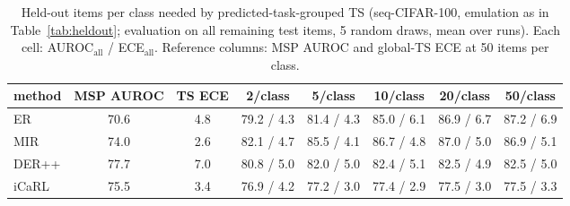 \begin{table}[h]\centering\small
\caption{Held-out items per class needed by predicted-task-grouped TS (seq-CIFAR-100, emulation as in Table~\ref{tab:heldout}; evaluation on all remaining test items, 5 random draws, mean over runs). Each cell: AUROC$_\mathrm{all}$ / ECE$_\mathrm{all}$. Reference columns: MSP AUROC and global-TS ECE at 50 items per class.}\label{tab:size}
\begin{tabular}{lccccccc}\toprule
method & MSP AUROC & TS ECE & 2/class & 5/class & 10/class & 20/class & 50/class\\\midrule
ER & 70.6 & 4.8 & 79.2 / 4.3 & 81.4 / 4.3 & 85.0 / 6.1 & 86.9 / 6.7 & 87.2 / 6.9\\
MIR & 74.0 & 2.6 & 82.1 / 4.7 & 85.5 / 4.1 & 86.7 / 4.8 & 87.0 / 5.0 & 86.9 / 5.1\\
DER++ & 77.7 & 7.0 & 80.8 / 5.0 & 82.0 / 5.0 & 82.4 / 5.1 & 82.5 / 4.9 & 82.5 / 5.0\\
iCaRL & 75.5 & 3.4 & 76.9 / 4.2 & 77.2 / 3.0 & 77.4 / 2.9 & 77.5 / 3.0 & 77.5 / 3.3\\
\bottomrule\end{tabular}
\end{table}
